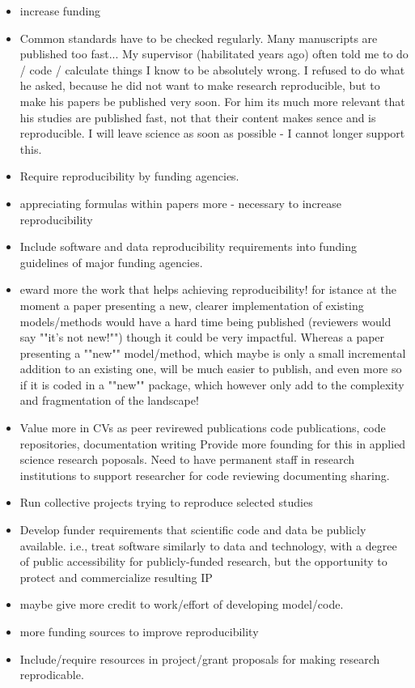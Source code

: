 \documentclass{article}
\begin{document}
\begin{itemize}
	\item increase funding
	\item Common standards have to be checked regularly. Many manuscripts are published too fast...
My supervisor (habilitated years ago) often told me to do / code / calculate things I know to be absolutely wrong. I refused to do what he asked, because he did not want to make research reproducible, but to make his papers be published very soon. For him its much more relevant that his studies are published fast, not that their content makes sence and is reproducible. 
I will leave science as soon as possible - I cannot longer support this.
	\item Require reproducibility by funding agencies. 
	\item appreciating formulas within papers more - necessary to increase reproducibility 
	\item Include software and data reproducibility requirements into funding guidelines of major funding agencies.
	\item eward more the work that helps achieving reproducibility! for istance at the moment a paper presenting a new, clearer implementation of existing models/methods would have a hard time being published (reviewers would say ""it's not new!"") though it could be very impactful. Whereas a paper presenting a ""new"" model/method, which maybe is only a small incremental addition to an existing one, will be much easier to publish, and even more so if it is coded in a ""new"" package, which however only add to the complexity and fragmentation of the landscape!  
	\item Value more in CVs as peer revirewed publications code publications, code repositories, documentation writing Provide more founding for this in applied science research poposals. Need to have permanent staff in research institutions to support researcher for code reviewing documenting sharing. 
	\item Run collective projects trying to reproduce selected studies
	\item Develop funder requirements that scientific code and data be publicly available.  i.e., treat software similarly to data and technology, with a degree of public accessibility for publicly-funded research, but the opportunity to protect and commercialize resulting IP
	\item maybe give more credit to work/effort of developing model/code.
	\item more funding sources to improve reproducibility
	\item Include/require resources in project/grant proposals for making research reprodicable.

\end{itemize}
\end{document}
